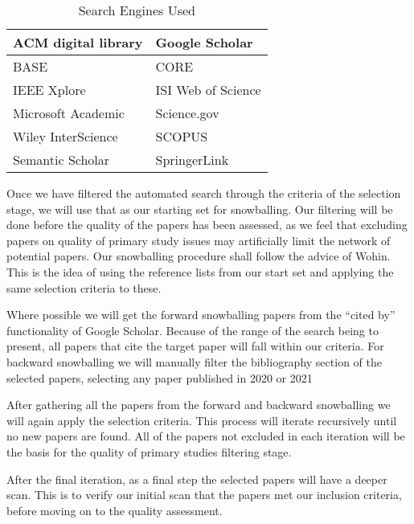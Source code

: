 \begin{table}[H]
    \begin{center}         
        \begin{tabular}{|l||l|}
            \hline
            ACM digital library       & Google Scholar       \\
            \hline
            BASE                      & CORE                 \\
            \hline  
            IEEE Xplore               & ISI Web of Science   \\
            \hline  
            Microsoft Academic        & Science.gov          \\
            \hline  
            Wiley InterScience        & SCOPUS               \\
            \hline  
            Semantic Scholar          & SpringerLink         \\
            \hline  
        \end{tabular}
    \end{center}
    \caption{Search Engines Used}
    \label{table:searchEngines}
\end{table}

Once we have filtered the automated search through the criteria of the selection stage, we will use that as our starting set for snowballing.
Our filtering will be done before the quality of the papers has been assessed, as we feel that excluding papers on quality of primary study issues may artificially limit the network of potential papers.
Our snowballing procedure shall follow the advice of Wohin\cite{Wohlin_2014}.
This is the idea of using the reference lists from our start set and applying the same selection criteria to these.  

Where possible we will get the forward snowballing papers from the ``cited by'' functionality of Google Scholar.
Because of the range of the search being to present, all papers that cite the target paper will fall within our criteria.
For backward snowballing we will manually filter the bibliography section of the selected papers, selecting any paper published in 2020 or 2021

After gathering all the papers from the forward and backward snowballing we will again apply the selection criteria.
This process will iterate recursively until no new papers are found.  
All of the papers not excluded in each iteration will be the basis for the quality of primary studies filtering stage.

After the final iteration, as a final step the selected papers will have a deeper scan.
This is to verify our initial scan that the papers met our inclusion criteria, before moving on to the quality assessment.

